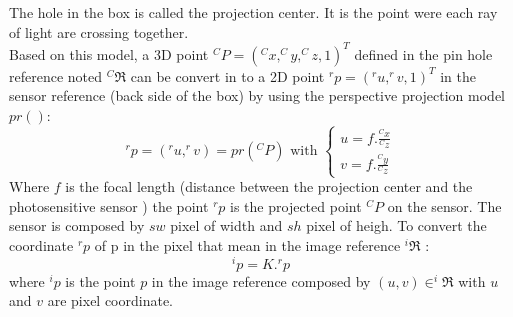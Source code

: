     \iffalse
The hole in the box is called the projection center. It is the point were each ray of light are crossing together.  \\
Based on this model, a 3D point $^CP=(^Cx,^Cy,^Cz,1)^T$ defined in the pin hole reference noted $ ^C\Re$ can be convert in to a 2D point  $^rp=(^ru,^rv,1)^T$ in the sensor reference (back side of the box) by using  the perspective projection model $pr() $: 
\begin{equation}
^rp=(^ru,^rv)= pr(^CP) \mbox{ with } \begin{cases} u= f.\frac{^Cx}{^Cz} \\  v= f.\frac{^Cy}{^Cz} 
\end{cases} 
\end{equation}
Where $f$ is the focal length (distance between the projection center and the photosensitive sensor )
the point $^rp$ is the projected point $^CP$ on the sensor. The sensor is composed by $sw$ pixel of width and $sh$  pixel of  heigh. To convert the coordinate $^rp$ of p in the pixel  that mean in the image reference $^i\Re$ : 
\begin{equation}
^ip=K. ^rp
\end{equation}
where $^ip$  is the point $p$ in the image reference composed by $(u,v) \in ^i\Re$ with $u$ and $v$ are  pixel coordinate. 



